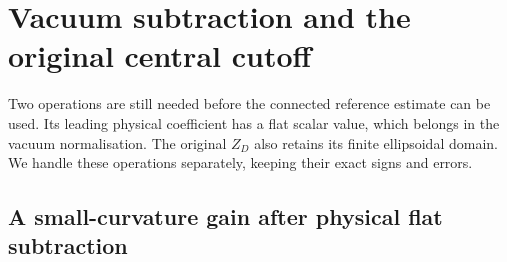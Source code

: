 \documentclass[11pt,reqno]{amsart}
\numberwithin{equation}{section}
\theoremstyle{definition}
\theoremstyle{remark}
\begin{document}
\section{Vacuum subtraction and the original central cutoff}
\label{sec:connected-original-central}

Two operations are still needed before the connected
reference estimate can be used.
Its leading physical coefficient has a flat scalar
value, which belongs in the vacuum normalisation.
The original \(Z_D\) also retains its finite
ellipsoidal domain.
We handle these operations separately, keeping
their exact signs and errors.

\subsection{A small-curvature gain after physical flat subtraction}
\end{document}
